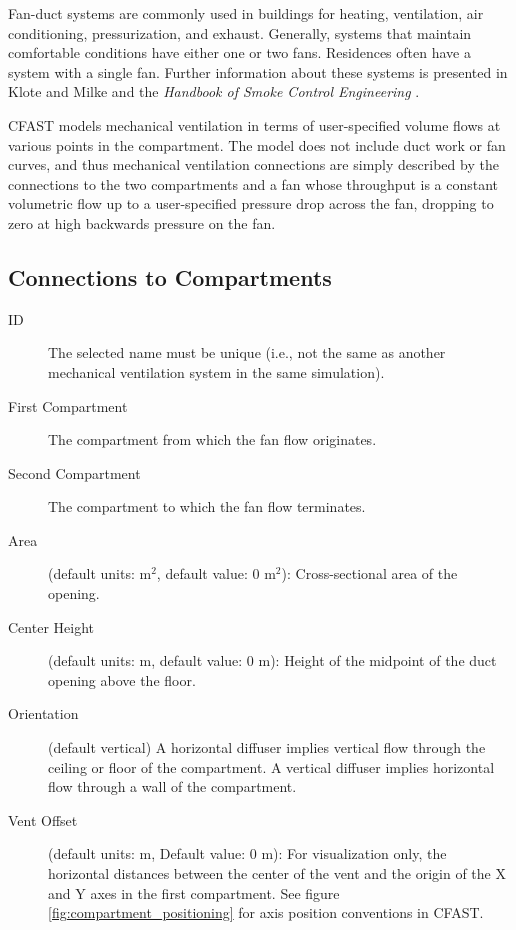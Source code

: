 Fan-duct systems are commonly used in buildings for heating, ventilation, air conditioning, pressurization, and exhaust. Generally, systems that maintain comfortable conditions have either one or two fans.  Residences often have a system with a single fan. Further information about these systems is presented in  Klote and Milke \cite{Klote:2002} and the  \textit{Handbook of Smoke Control Engineering} \cite{Klote:2012}.

CFAST models mechanical ventilation in terms of user-specified volume flows at various points in the compartment. The model does not include duct work or fan curves, and thus mechanical ventilation connections are simply described by the connections to the two compartments and a fan whose throughput is a constant volumetric flow up to a user-specified pressure drop across the fan, dropping to zero at high backwards pressure on the fan.

\subsection{Connections to Compartments}
\label{info:VENT3}
\begin{description}
\item[ID]  The selected name must be unique (i.e., not the same as another mechanical ventilation system in the same simulation).
\item[First Compartment] The compartment from which the fan flow originates.
\item[Second Compartment] The compartment to which the fan flow terminates.
\item[Area] (default units: m$^2$, default value: 0 m$^2$): Cross-sectional area of the opening.
\label{Mech Height}
\item[Center Height] (default units: m, default value: 0 m): Height of the midpoint of the duct opening above the floor.
\item[Orientation] (default vertical) A horizontal diffuser implies vertical flow through the ceiling or floor of the compartment.  A vertical diffuser implies horizontal flow through a wall of the compartment.
\item[Vent Offset] (default units: m, Default value: 0 m): For visualization only, the horizontal distances between the center of the vent and the origin of the X and Y axes in the first compartment. See figure \ref{fig:compartment_positioning} for axis position conventions in CFAST.
\end{description}

